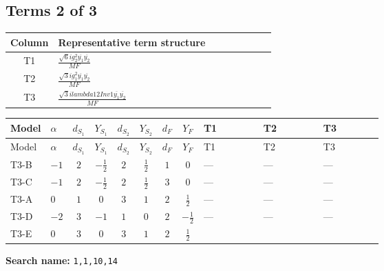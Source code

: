 \documentclass[8pt]{article}
\begin{document}
\begin{landscape}
\subsection*{Terms 2 of 3}
\begin{center}
\begin{tabular}{@{}c >{\raggedright\arraybackslash}p{0.82\linewidth}@{}}
\toprule
Column & Representative term structure \\
\midrule
T1 & \(\displaystyle \frac{\sqrt{6} i g_{2}^{2} \overline{y_{1}} \overline{y_{2}}}{MF}\) \\
\midrule
T2 & \(\displaystyle \frac{\sqrt{3} i g_{1}^{2} \overline{y_{1}} \overline{y_{2}}}{MF}\) \\
\midrule
T3 & \(\displaystyle \frac{\sqrt{3} i lambda12Inv1 \overline{y_{1}} \overline{y_{2}}}{MF}\) \\
\midrule
\bottomrule
\end{tabular}
\end{center}
\smallskip
\tiny
\begin{longtable}{@{}llcccccc >{\raggedright\arraybackslash}p{0.21\linewidth} >{\raggedright\arraybackslash}p{0.21\linewidth} >{\raggedright\arraybackslash}p{0.21\linewidth}@{}}
\toprule
Model & $\alpha$ & $d_{S_1}$ & $Y_{S_1}$ & $d_{S_2}$ & $Y_{S_2}$ & $d_F$ & $Y_F$ & T1 & T2 & T3 \\
\midrule
\endfirsthead
\toprule
Model & $\alpha$ & $d_{S_1}$ & $Y_{S_1}$ & $d_{S_2}$ & $Y_{S_2}$ & $d_F$ & $Y_F$ & T1 & T2 & T3 \\
\midrule
\endhead
T3-B & $-1$ & $2$ & $-\frac{1}{2}$ & $2$ & $\frac{1}{2}$ & $1$ & $0$ & --- & --- & --- \\
\midrule
T3-C & $-1$ & $2$ & $-\frac{1}{2}$ & $2$ & $\frac{1}{2}$ & $3$ & $0$ & --- & --- & --- \\
\midrule
T3-A & $0$ & $1$ & $0$ & $3$ & $1$ & $2$ & $\frac{1}{2}$ & --- & --- & --- \\
\midrule
T3-D & $-2$ & $3$ & $-1$ & $1$ & $0$ & $2$ & $-\frac{1}{2}$ & --- & --- & --- \\
\midrule
T3-E & $0$ & $3$ & $0$ & $3$ & $1$ & $2$ & $\frac{1}{2}$ & \scriptsize\adjustbox{max width=\linewidth}{$\begin{gathered} - \frac{\sqrt{6} i g_{2}^{2} \overline{y_{1}} \overline{y_{2}}}{3 MF}\end{gathered}$} & \scriptsize\adjustbox{max width=\linewidth}{$\begin{gathered} - \frac{\sqrt{3} i g_{1}^{2} \overline{y_{1}} \overline{y_{2}}}{8 MF}\end{gathered}$} & \scriptsize\adjustbox{max width=\linewidth}{$\begin{gathered} \frac{\sqrt{3} i lambda12Inv1 \overline{y_{1}} \overline{y_{2}}}{6 MF}\end{gathered}$} \\
\midrule
\bottomrule
\end{longtable}
\clearpage
\noindent\textbf{Search name: }\texttt{1,1,10,14}\par\smallskip

\end{landscape}
\end{document}
